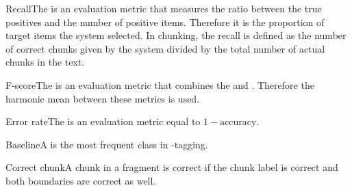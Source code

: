 \begin{df}{Recall}The \sb{} is an evaluation metric that measures the ratio between the true positives and the number of positive items. Therefore it is the proportion of target items the system selected. In chunking, the recall is defined as the number of correct chunks given by the system divided by the total number of actual chunks in the text.
\end{df}
\begin{df}{F-score}The \sb{} is an evaluation metric that combines the  and . Therefore the harmonic mean between these metrics is used.
\end{df}
\begin{df}{Error rate}The \sb{} is an evaluation metric equal to $1-\mbox{accuracy}$.
\end{df}
\begin{df}{Baseline}A \sb{} is the most frequent class in \pos{}-tagging.
\end{df}
\begin{df}{Correct chunk}A chunk in a fragment is correct if the chunk label is correct and both boundaries are correct as well.
\end{df}